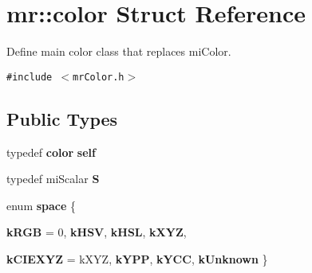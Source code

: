 \section{mr::color Struct Reference}
\label{structmr_1_1color}
Define main color class that replaces mi\-Color.  


{\tt \#include $<$mr\-Color.h$>$}

\subsection*{Public Types}
\begin{CompactItemize}
\item 
typedef {\bf color} {\bf self}
\item 
typedef mi\-Scalar {\bf S}
\item 
enum {\bf space} \{ \par
{\bf k\-RGB} =  0, 
{\bf k\-HSV}, 
{\bf k\-HSL}, 
{\bf k\-XYZ}, 
\par
{\bf k\-CIEXYZ} =  k\-XYZ, 
{\bf k\-YPP}, 
{\bf k\-YCC}, 
{\bf k\-Unknown}
 \}
\end{CompactItemize}
